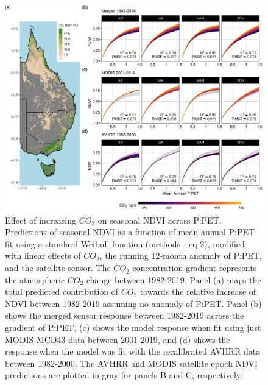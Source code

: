 \documentclass[gc, manuscript]{copernicus}
\begin{document}
\begin{figure}
\includegraphics[width=14cm]{../../figures/Fig5_n4_ndvi_map_weibull_ppet_x_co2_modeled_effect} \caption{Effect of increasing $CO_2$ on seasonal NDVI across P:PET. Predictions of seasonal NDVI as a function of mean annual P:PET fit using a standard Weibull function (methods - eq 2), modified with linear effects of $CO_2$, the running 12-month anomaly of P:PET, and the satellite sensor. The $CO_2$ concentration gradient represents the atmospheric $CO_2$ change between 1982-2019. Panel (a) maps the total predicted contribution of $CO_2$ towards the relative increase of NDVI between 1982-2019 assuming no anomaly of P:PET. Panel (b) shows the merged sensor response between 1982-2019 across the gradient of P:PET, (c) shows the model response when fit using just MODIS MCD43 data between 2001-2019, and (d) shows the response when the model was fit with the recalibrated AVHRR data between 1982-2000. The AVHRR and MODIS satellite epoch NDVI predictions are plotted in gray for panels B and C, respectively.}\label{fig:unnamed-chunk-4}
\end{figure}
\clearpage
\end{document}
